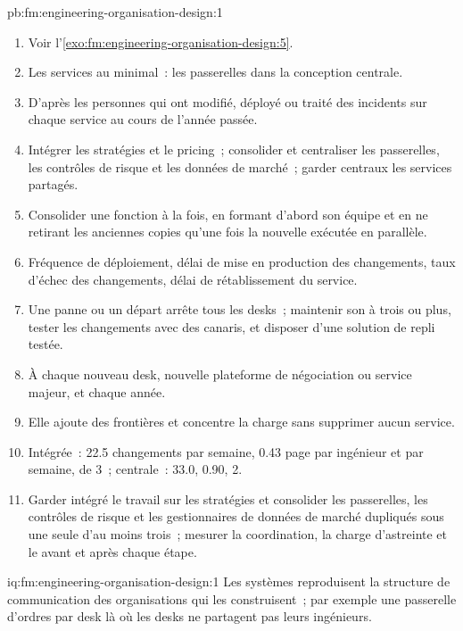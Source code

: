 \begin{solution}{pb:fm:engineering-organisation-design:1}
\begin{enumerate}
6~\%.
\item Voir l'\cref{exo:fm:engineering-organisation-design:5}.
\item Les services au  minimal~: les passerelles dans la conception centrale.
\item D'après les personnes qui ont modifié, déployé ou traité des incidents sur chaque service au cours de l'année passée.
\item Intégrer les stratégies et le pricing~; consolider et centraliser les passerelles, les contrôles de risque et les données de marché~; garder centraux les services partagés.
\item Consolider une fonction à la fois, en formant d'abord son équipe et en ne retirant les anciennes copies qu'une fois la nouvelle exécutée en parallèle.
\item Fréquence de déploiement, délai de mise en production des changements, taux d'échec des changements, délai de rétablissement du service.
\item Une panne ou un départ arrête tous les desks~; maintenir son  à trois ou plus, tester les changements avec des canaris, et disposer d'une solution de repli testée.
\item À chaque nouveau desk, nouvelle plateforme de négociation ou service majeur, et chaque année.
\item Elle ajoute des frontières et concentre la charge sans supprimer aucun service.
\item Intégrée~: 22.5 changements par semaine, 0.43 page par ingénieur et par semaine,  de 3~; centrale~: 33.0, 0.90, 2.
\item Garder intégré le travail sur les stratégies et consolider les passerelles, les contrôles de risque et les gestionnaires de données de marché dupliqués sous une seule  d'au moins
trois~; mesurer la coordination, la charge d'astreinte et le  avant et après chaque étape.
\end{enumerate}
\end{solution}

\begin{solution}{iq:fm:engineering-organisation-design:1}
Les systèmes reproduisent la structure de communication des organisations qui les construisent~; par exemple une passerelle d'ordres par desk là où les desks ne partagent pas
leurs ingénieurs.
\end{solution}

